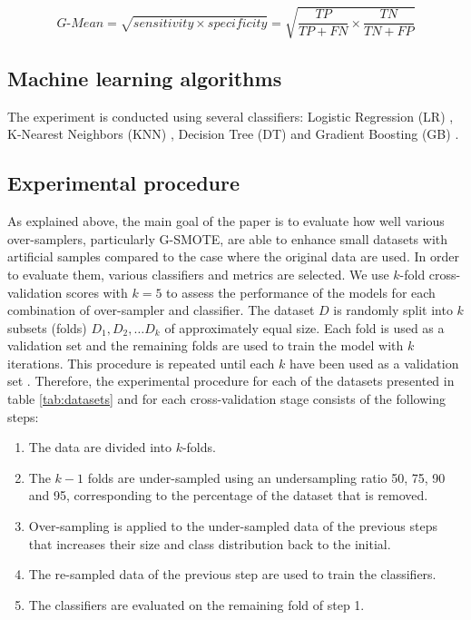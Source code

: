 \documentclass[parskip=full]{scrartcl}
\begin{document}
$$\textit{G-Mean} = \sqrt{sensitivity \times specificity} = \sqrt{\dfrac{TP}{TP + FN}
\times \dfrac{TN}{TN + FP}}$$

\subsection{Machine learning algorithms}

The experiment is conducted using several classifiers: Logistic Regression (LR)
\cite{McCullagh.2019}, K-Nearest Neighbors (KNN) \cite{Cover.1967}, Decision
Tree (DT) \cite{Salzberg.1994} and Gradient Boosting (GB) \cite{Friedman.2001}.

\subsection{Experimental procedure}

As explained above, the main goal of the paper is to evaluate how well various
over-samplers, particularly G-SMOTE, are able to enhance small datasets with
artificial samples compared to the case where the original data are used. In
order to evaluate them, various classifiers and metrics are selected. We use \(k
\)-fold cross-validation scores with \( k = 5 \) to assess the performance of
the models for each combination of over-sampler and classifier. The dataset \( D
\) is randomly split into \( k \) subsets (folds) \( D_1, D_2, … D_k \) of
approximately equal size. Each fold is used as a validation set and the
remaining folds are used to train the model with \( k \) iterations. This
procedure is repeated until each \( k \) have been used as a validation set
\cite{Han.2012}. Therefore, the experimental procedure for each of the datasets
presented in table \ref{tab:datasets} and for each cross-validation stage
consists of the following steps:

\begin{enumerate}

	\item The data are divided into \( k \)-folds.
	
	\item The \( k - 1 \) folds are under-sampled using an undersampling ratio
	50, 75, 90 and 95, corresponding to the percentage of the dataset that is
	removed.

	\item Over-sampling is applied to the under-sampled data of the previous
	steps that increases their size and class distribution back to the initial.

	\item The re-sampled data of the previous step are used to train the
	classifiers.
	
	\item The classifiers are evaluated on the remaining fold of step 1.

\end{enumerate}
\end{document}

